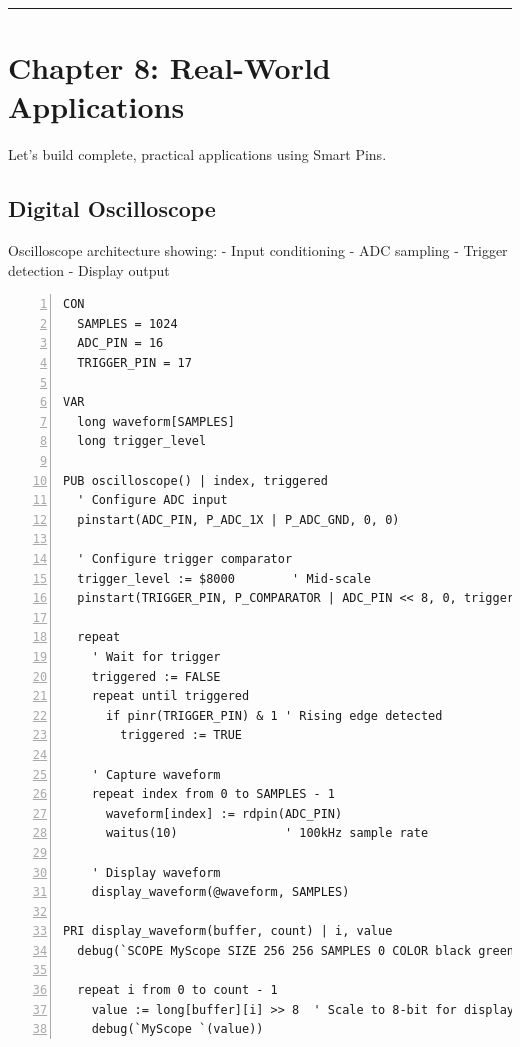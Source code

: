 \documentclass[11pt,a4paper,oneside,english]{book}
\begin{document}
\begin{center}\rule{0.5\linewidth}{0.5pt}\end{center}

\clearpage

\clearpage

\hypertarget{chapter-8-real-world-applications}{%
\chapter{Chapter 8: Real-World
Applications}\label{chapter-8-real-world-applications}}

Let's build complete, practical applications using Smart Pins.

\hypertarget{digital-oscilloscope}{%
\section{Digital Oscilloscope}\label{digital-oscilloscope}}

Oscilloscope architecture showing: - Input conditioning - ADC sampling -
Trigger detection - Display output

\begin{Spin2Block}
\begin{Verbatim}[numbers=left,numbersep=5pt,xleftmargin=15pt]
CON
  SAMPLES = 1024
  ADC_PIN = 16
  TRIGGER_PIN = 17
  
VAR
  long waveform[SAMPLES]
  long trigger_level
  
PUB oscilloscope() | index, triggered
  ' Configure ADC input
  pinstart(ADC_PIN, P_ADC_1X | P_ADC_GND, 0, 0)
  
  ' Configure trigger comparator
  trigger_level := $8000        ' Mid-scale
  pinstart(TRIGGER_PIN, P_COMPARATOR | ADC_PIN << 8, 0, trigger_level)
  
  repeat
    ' Wait for trigger
    triggered := FALSE
    repeat until triggered
      if pinr(TRIGGER_PIN) & 1 ' Rising edge detected
        triggered := TRUE
    
    ' Capture waveform
    repeat index from 0 to SAMPLES - 1
      waveform[index] := rdpin(ADC_PIN)
      waitus(10)               ' 100kHz sample rate
    
    ' Display waveform
    display_waveform(@waveform, SAMPLES)

PRI display_waveform(buffer, count) | i, value
  debug(`SCOPE MyScope SIZE 256 256 SAMPLES 0 COLOR black green`)
  
  repeat i from 0 to count - 1
    value := long[buffer][i] >> 8  ' Scale to 8-bit for display
    debug(`MyScope `(value))
\end{Verbatim}
\end{Spin2Block}
\end{document}

